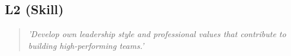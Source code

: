 \subsection{L2 (Skill)}

  \begin{quote}
    \textit{'Develop own leadership style and professional
    values that contribute to building high-performing teams.'}
  \end{quote}

\newpage